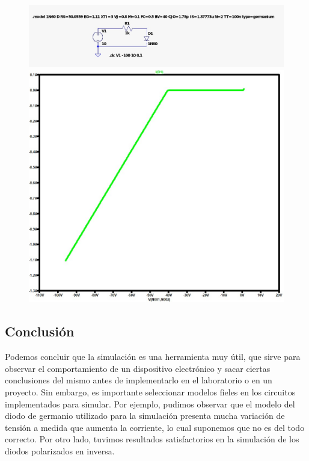 \documentclass[chaptersright]{informeutn}
\begin{document}
    \begin{figure}[H]
      \centering
      \begin{minipage}{1\textwidth}
        \centering
        \includegraphics[width=\linewidth]{pictures/circuito_diodo_germanio_inversa.jpeg}
      \end{minipage}
      \hfill
      \begin{minipage}{0.45\textwidth}
        \centering
        \includegraphics[width=\linewidth]{pictures/curva_diodo_germanio_inversa.jpeg}
      \end{minipage}
    \end{figure}

    \subsection{Conclusión}
    Podemos concluir que la simulación es una herramienta muy útil, que sirve para observar el comportamiento de un dispositivo 
    electrónico y sacar ciertas conclusiones del mismo antes de implementarlo en el laboratorio o en un proyecto. Sin embargo, 
    es importante seleccionar modelos fieles en los circuitos implementados para simular. Por ejemplo, pudimos observar que el 
    modelo del diodo de germanio utilizado para la simulación presenta mucha variación de tensión a medida que aumenta la 
    corriente, lo cual suponemos que no es del todo correcto. Por otro lado, tuvimos resultados satisfactorios en la simulación 
    de los diodos polarizados en inversa. 
\end{document}
